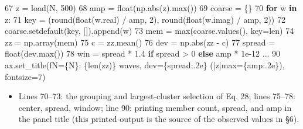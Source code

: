 \documentclass[
  a4paper,
]{ltjsarticle}
\newenvironment{Shaded}{}{}
\newcommand{\BuiltInTok}[1]{\textcolor[rgb]{0.00,0.50,0.00}{#1}}
\newcommand{\ControlFlowTok}[1]{\textcolor[rgb]{0.00,0.44,0.13}{\textbf{#1}}}
\newcommand{\DecValTok}[1]{\textcolor[rgb]{0.25,0.63,0.44}{#1}}
\newcommand{\FloatTok}[1]{\textcolor[rgb]{0.25,0.63,0.44}{#1}}
\newcommand{\KeywordTok}[1]{\textcolor[rgb]{0.00,0.44,0.13}{\textbf{#1}}}
\newcommand{\NormalTok}[1]{#1}
\newcommand{\OperatorTok}[1]{\textcolor[rgb]{0.40,0.40,0.40}{#1}}
\newcommand{\SpecialCharTok}[1]{\textcolor[rgb]{0.25,0.44,0.63}{#1}}
\newcommand{\SpecialStringTok}[1]{\textcolor[rgb]{0.73,0.40,0.53}{#1}}
\providecommand{\tightlist}{%
  \setlength{\itemsep}{0pt}\setlength{\parskip}{0pt}}
\begin{document}
\begin{Shaded}
\begin{Highlighting}[]
    \DecValTok{67}\NormalTok{      z }\OperatorTok{=}\NormalTok{ load(N, }\DecValTok{500}\NormalTok{)}
    \DecValTok{68}\NormalTok{      amp }\OperatorTok{=} \BuiltInTok{float}\NormalTok{(np.}\BuiltInTok{abs}\NormalTok{(z).}\BuiltInTok{max}\NormalTok{())}
    \DecValTok{69}\NormalTok{      coarse }\OperatorTok{=}\NormalTok{ \{\}}
    \DecValTok{70}      \ControlFlowTok{for}\NormalTok{ w }\KeywordTok{in}\NormalTok{ z:}
    \DecValTok{71}\NormalTok{          key }\OperatorTok{=}\NormalTok{ (}\BuiltInTok{round}\NormalTok{(}\BuiltInTok{float}\NormalTok{(w.real) }\OperatorTok{/}\NormalTok{ amp, }\DecValTok{2}\NormalTok{), }\BuiltInTok{round}\NormalTok{(}\BuiltInTok{float}\NormalTok{(w.imag) }\OperatorTok{/}\NormalTok{ amp, }\DecValTok{2}\NormalTok{))}
    \DecValTok{72}\NormalTok{          coarse.setdefault(key, []).append(w)}
    \DecValTok{73}\NormalTok{      mem }\OperatorTok{=} \BuiltInTok{max}\NormalTok{(coarse.values(), key}\OperatorTok{=}\BuiltInTok{len}\NormalTok{)}
    \DecValTok{74}\NormalTok{      zz }\OperatorTok{=}\NormalTok{ np.array(mem)}
    \DecValTok{75}\NormalTok{      c }\OperatorTok{=}\NormalTok{ zz.mean()}
    \DecValTok{76}\NormalTok{      dev }\OperatorTok{=}\NormalTok{ np.}\BuiltInTok{abs}\NormalTok{(zz }\OperatorTok{{-}}\NormalTok{ c)}
    \DecValTok{77}\NormalTok{      spread }\OperatorTok{=} \BuiltInTok{float}\NormalTok{(dev.}\BuiltInTok{max}\NormalTok{())}
    \DecValTok{78}\NormalTok{      win }\OperatorTok{=}\NormalTok{ spread }\OperatorTok{*} \FloatTok{1.4} \ControlFlowTok{if}\NormalTok{ spread }\OperatorTok{\textgreater{}} \DecValTok{0} \ControlFlowTok{else}\NormalTok{ amp }\OperatorTok{*} \FloatTok{1e{-}12}
\NormalTok{...}
    \DecValTok{90}\NormalTok{      ax.set\_title(}\SpecialStringTok{f\textquotesingle{}N=}\SpecialCharTok{\{}\NormalTok{N}\SpecialCharTok{\}}\SpecialStringTok{: }\SpecialCharTok{\{}\BuiltInTok{len}\NormalTok{(zz)}\SpecialCharTok{\}}\SpecialStringTok{ waves, dev=}\SpecialCharTok{\{}\NormalTok{spread}\SpecialCharTok{:.2e\}}\SpecialStringTok{ (|z|max=}\SpecialCharTok{\{}\NormalTok{amp}\SpecialCharTok{:.2e\}}\SpecialStringTok{)\textquotesingle{}}\NormalTok{, fontsize}\OperatorTok{=}\DecValTok{7}\NormalTok{)}
\end{Highlighting}
\end{Shaded}

\begin{itemize}
\tightlist
\item
  Lines 70--73: the grouping and largest-cluster selection of Eq. 28;
  lines 75--78: center, spread, window; line 90: printing member count,
  spread, and amp in the panel title (this printed output is the source
  of the observed values in §6).
\end{itemize}
\end{document}

